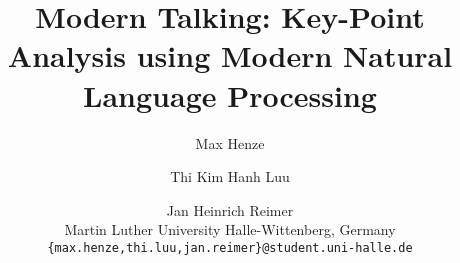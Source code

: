 \documentclass[11pt]{article}
\title{Modern Talking: Key-Point Analysis using Modern Natural Language Processing}
\author{%
  Max Henze \and Thi Kim Hanh Luu \and Jan Heinrich Reimer \\
  Martin Luther University Halle-Wittenberg, Germany \\ 
  \texttt{\{max.henze,thi.luu,jan.reimer\}@student.uni-halle.de}%
}
\begin{document}
\maketitle

\begin{abstract}
  
\end{abstract}











\appendix


\end{document}
